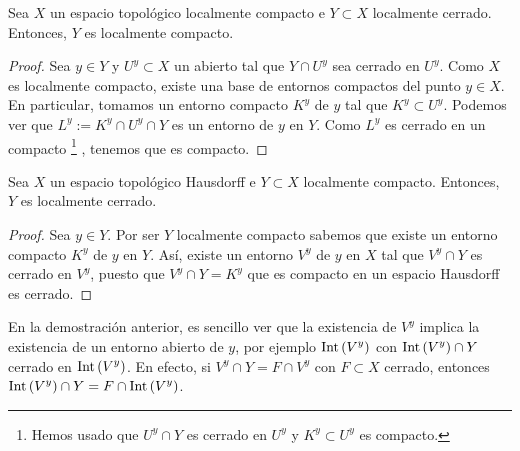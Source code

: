 \begin{prop}
Sea $\displaystyle X $ un espacio topológico localmente compacto e $\displaystyle Y\subset X $ localmente cerrado. Entonces, $\displaystyle Y $ es localmente compacto.
\end{prop}
\begin{proof}
Sea $\displaystyle y \in Y $ y $\displaystyle U^{y}\subset X $ un abierto tal que $\displaystyle Y\cap U^{y} $ sea cerrado en $\displaystyle U^{y} $. Como $\displaystyle X $ es localmente compacto, existe una base de entornos compactos del punto $\displaystyle y \in X $. En particular, tomamos un entorno compacto $\displaystyle K^{y} $ de $\displaystyle y $ tal que $\displaystyle K^{y}\subset U^{y} $. Podemos ver que $\displaystyle L^{y}:= K^{y}\cap U^{y}\cap Y $ es un entorno de $\displaystyle y $ en $\displaystyle Y $. 
Como $\displaystyle L^{y} $ es cerrado en un compacto \footnote{Hemos usado que $\displaystyle U^{y}\cap Y $ es cerrado en $\displaystyle U^{y} $ y $\displaystyle K^{y}\subset U^{y} $ es compacto.} , tenemos que es compacto. 
\end{proof}
\begin{prop}
Sea $\displaystyle X $ un espacio topológico Hausdorff e $\displaystyle Y\subset X $ localmente compacto. Entonces, $\displaystyle Y $ es localmente cerrado.
\end{prop}
\begin{proof}
Sea $\displaystyle y \in Y $. Por ser $\displaystyle Y $ localmente compacto sabemos que existe un entorno compacto $\displaystyle K^{y} $ de $\displaystyle y $ en $\displaystyle Y $. Así, existe un entorno $\displaystyle V^{y} $ de $\displaystyle y $ en $\displaystyle X $ tal que $\displaystyle V^{y}\cap Y $ es cerrado en $\displaystyle V^{y} $, puesto que $\displaystyle V^{y}\cap Y = K^{y} $ que es compacto en un espacio Hausdorff es cerrado. 
\end{proof}
\begin{observation}
En la demostración anterior, es sencillo ver que la existencia de $\displaystyle V^{y} $ implica la existencia de un entorno abierto de $\displaystyle y $, por ejemplo $\displaystyle \operatorname{Int}\left(V^{y}\right) $ con $\displaystyle \operatorname{Int}\left(V^{y}\right)\cap Y $ cerrado en $\displaystyle \operatorname{Int}\left(V^{y}\right) $. 
En efecto, si $\displaystyle V^{y}\cap Y = F \cap V^{y} $ con $\displaystyle F \subset X $ cerrado, entonces $\displaystyle \operatorname{Int}\left(V^{y}\right)\cap Y = F \cap \operatorname{Int}\left(V^{y}\right) $. 
\end{observation}

